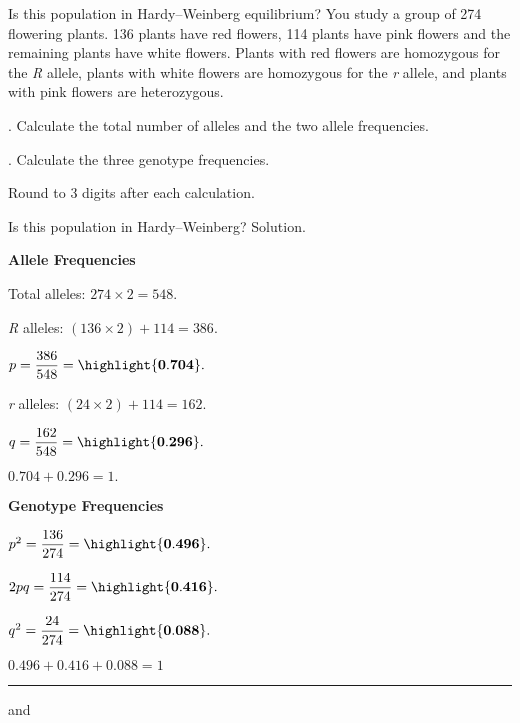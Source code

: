 \documentclass[t,handout]{beamer}  %
\begin{document}
%
\begin{frame}{Is this population in Hardy--Weinberg equilibrium?}
	\hangpara You study a group of 274 flowering plants.  136 plants have red flowers, 114 plants have pink flowers and the remaining plants have white flowers. Plants with red flowers are homozygous for the \emph{R} allele, plants with white flowers are homozygous for the \emph{r} allele, and plants with pink flowers are heterozygous.

	. Calculate the total number of alleles and the two allele frequencies.

	. Calculate the three genotype frequencies.

	\hangpara Round to 3 digits after each calculation.
\end{frame}
%
{
\begin{frame}{Is this population in Hardy--Weinberg? Solution.}
\begin{multicols}{2}

	\hangpara \textbf{Allele Frequencies}
	
	\hangpara Total alleles: $274 \times 2 = 548.$
	
	\hangpara \emph{R} alleles: $(136 \times 2) + 114 = 386.$
	
	\hangpara $p = \dfrac{386}{548} = \highlight{\mathbf{0.704}}.$

	\hangpara \emph{r} alleles: $(24 \times 2) + 114 = 162.$ 

	\hangpara $q = \dfrac{162}{548} = \highlight{\mathbf{0.296}}.$
	
	\hangpara $0.704 + 0.296 = 1.$ \checkmark

\columnbreak

	\hangpara \textbf{Genotype Frequencies}
	
	\hangpara $p^2 = \dfrac{136}{274} = \highlight{\mathbf{0.496}}.$ 

	\hangpara $2pq = \dfrac{114}{274} = \highlight{\mathbf{0.416}}.$

	\hangpara $q^2 = \dfrac{24}{274} = \highlight{\mathbf{0.088}}.$

	\hangpara $0.496 + 0.416 + 0.088 = 1$ \checkmark
	
	\rule{0.4\textwidth}{0.1pt}\vspace{-0.5\baselineskip}
	
	\hangpara {} and
	

\end{multicols}
\end{frame}
}
%
\end{document}
